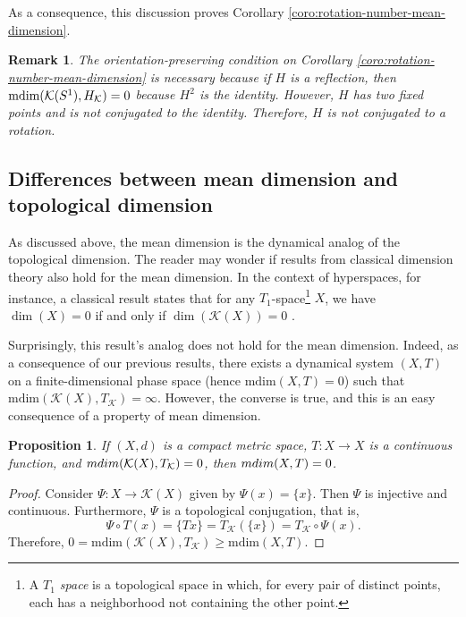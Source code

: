 \documentclass[sn-mathphys-num]{sn-jnl}%
\theoremstyle{thmstyleone}%
\newtheorem{proposition}{Proposition}%
\theoremstyle{thmstyletwo}%
\newtheorem{remark}{Remark}%
\theoremstyle{thmstylethree}%
\newcommand*\induce[1]{#1_\mathcal{K}}
\newcommand*\hyp[1]{\mathcal{#1}}
\begin{document}
As a consequence, this discussion proves Corollary \ref{coro:rotation-number-mean-dimension}.\\

\begin{remark}
    The orientation-preserving condition on Corollary \emph{\ref{coro:rotation-number-mean-dimension}} is necessary because if $H$ is a reflection, then $\normalfont{\text{mdim}}(\hyp{K}(S^1), \induce{H}) = 0$ because $H^2$ is the identity. However, $H$ has two fixed points and is not conjugated to the identity. Therefore, $H$ is not conjugated to a rotation.
\end{remark}


\subsection{Differences between mean dimension and topological dimension}\label{subsec:difference-mean-top-dim}

As discussed above, the mean dimension is the dynamical analog of the topological dimension. The reader may wonder if results from classical dimension theory also hold for the mean dimension. In the context of hyperspaces, for instance, a classical result states that for any $T_1$-space\footnote{A \emph{$T_1$ space} is a topological space in which, for every pair of distinct points, each has a neighborhood not containing the other point.} $X$, we have $\dim(X) = 0$ if and only if $\dim(\hyp{K}(X)) = 0$ \cite[Proposition 8.6]{illanes_nadler_1999}.

Surprisingly, this result's analog does not hold for the mean dimension. Indeed, as a consequence of our previous results, there exists a dynamical system $(X, T)$ on a finite-dimensional phase space (hence $\text{mdim}(X, T) = 0$) such that $\text{mdim}(\hyp{K}(X), \induce{T}) = \infty$. However, the converse is true, and this is an easy consequence of a property of mean dimension.\\

\begin{proposition}
    If $(X, d)$ is a compact metric space, $T: X \to X$ is a continuous function, and $\emph{mdim}(\hyp{K}(X), \induce{T}) = 0$, then $\emph{mdim}(X, T) = 0$.
\end{proposition}
\begin{proof}
    Consider $\Psi: X \to \hyp{K}(X)$ given by $\Psi(x) = \{x\}$. Then $\Psi$ is injective and continuous. Furthermore, $\Psi$ is a topological conjugation, that is, 
    \begin{equation*}
        \Psi\circ T(x) = \{Tx\} = \induce{T}(\{x\}) = \induce{T}\circ\Psi(x).
    \end{equation*}
    Therefore, $0 = \text{mdim}(\hyp{K}(X), \induce{T}) \geq \text{mdim}(X, T)$.
\end{proof}
\end{document}
